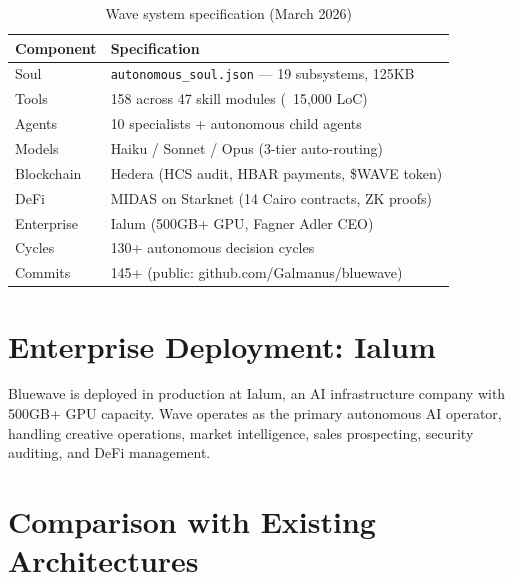 \documentclass[12pt,a4paper,twoside]{article}
\theoremstyle{plain}
\theoremstyle{definition}
\theoremstyle{remark}
\begin{document}
\begin{table}[H]
\centering
\caption{Wave system specification (March 2026)}
\begin{tabular}{ll}
\toprule
\textbf{Component} & \textbf{Specification} \\
\midrule
Soul & \texttt{autonomous\_soul.json} --- 19 subsystems, 125KB \\
Tools & 158 across 47 skill modules (~15,000 LoC) \\
Agents & 10 specialists + autonomous child agents \\
Models & Haiku / Sonnet / Opus (3-tier auto-routing) \\
Blockchain & Hedera (HCS audit, HBAR payments, \$WAVE token) \\
DeFi & MIDAS on Starknet (14 Cairo contracts, ZK proofs) \\
Enterprise & Ialum (500GB+ GPU, Fagner Adler CEO) \\
Cycles & 130+ autonomous decision cycles \\
Commits & 145+ (public: github.com/Galmanus/bluewave) \\
\bottomrule
\end{tabular}
\end{table}


\section{Enterprise Deployment: Ialum}

Bluewave is deployed in production at Ialum, an AI infrastructure company with 500GB+ GPU capacity. Wave operates as the primary autonomous AI operator, handling creative operations, market intelligence, sales prospecting, security auditing, and DeFi management.


\section{Comparison with Existing Architectures}
\end{document}

